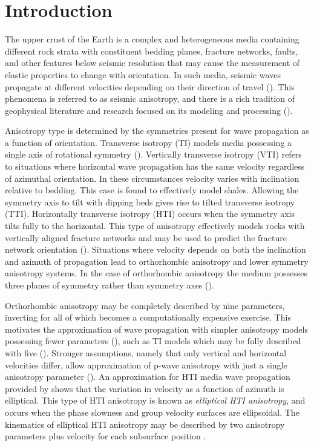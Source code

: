 \section{Introduction}
The upper crust of the Earth is a complex and heterogeneous media containing different rock strata with constituent bedding planes, fracture networks, faults, and other features below seismic resolution that may cause the measurement of elastic properties to change with orientation.  In such media, seismic waves propagate at different velocities depending on their direction of travel (\citealp{crampin-1981,crampin-1984b,crampin-1985,thomsen-1988}).  This phenomena is referred to as seismic anisotropy, and there is a rich tradition of geophysical literature and research focused on its modeling and processing (\citealp{crampin-1984a,helbig-1994,thomsen-2002,helbig-2005,grechka-2009,tsvankin-2010,tsvankin-2012}). 

Anisotropy type is determined by the symmetries present for wave propagation as a function of orientation.  Transverse isotropy (TI) models media possessing a single axis of rotational symmetry 
(\citealp{crampin-1986,thomsen-1988}). Vertically transverse isotropy (VTI) refers to situations where horizontal wave propagation has the same velocity regardless of azimuthal orientation.  In these circumstances velocity varies with inclination  relative to bedding.  This case is found to effectively model shales.  Allowing the symmetry axis to tilt with dipping beds gives rise to tilted transverse isotropy (TTI).  Horizontally transverse isotropy (HTI) occurs when the symmetry axis tilts fully to the horizontal.  This type of anisotropy effectively models rocks with vertically aligned fracture networks and may be used to predict the fracture network orientation (\citealp{corrigan-1996,tod-2007}).  Situations where velocity depends on both the inclination and azimuth of propagation lead to orthorhombic anisotropy and lower symmetry anisotropy systems.  In the case of orthorhombic anisotropy the medium possesses three planes of symmetry rather than symmetry axes (\citealp{crampin-1986,thomsen-1988,tsvankin-1997}).  

Orthorhombic anisotropy may be completely described by nine parameters, inverting for all of which becomes a computationally expensive exercise.  This motivates the approximation of wave propagation with simpler anisotropy models possessing fewer parameters (\citealp{grechka-2005}), such as TI models which may be fully described with five  (\citealp{tsvankin-1997,tsvankin-2012}).   Stronger assumptions, namely that only vertical and horizontal velocities differ, allow approximation of p-wave anisotropy with just a single anisotropy parameter (\citealp{alkhalifah-1995}).  An approximation for HTI media wave propagation provided by \cite{grechka-1998} shows that the variation in velocity as a function of azimuth is elliptical. This type of HTI anisotropy is known as \emph{elliptical HTI anisotropy}, and occurs when the phase slowness and group velocity surfaces are ellipsoidal.  The kinematics of elliptical HTI anisotropy may be described by two anisotropy parameters plus velocity for each subsurface position \cite[]{abedi-2019}.


